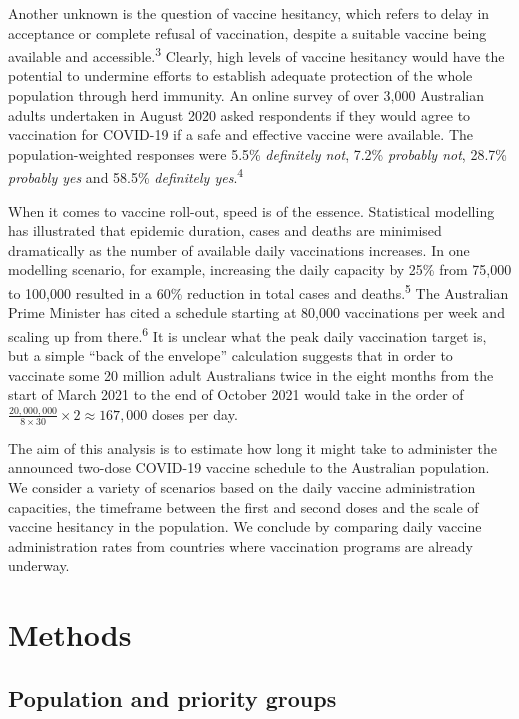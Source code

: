 \documentclass{article}
\begin{document}
Another unknown is the question of vaccine hesitancy, which refers to
delay in acceptance or complete refusal of vaccination, despite a
suitable vaccine being available and accessible.\textsuperscript{3}
Clearly, high levels of vaccine hesitancy would have the potential to
undermine efforts to establish adequate protection of the whole
population through herd immunity. An online survey of over 3,000
Australian adults undertaken in August 2020 asked respondents if they
would agree to vaccination for COVID-19 if a safe and effective vaccine
were available. The population-weighted responses were 5.5\%
\emph{definitely not}, 7.2\% \emph{probably not}, 28.7\% \emph{probably
yes} and 58.5\% \emph{definitely yes}.\textsuperscript{4}

When it comes to vaccine roll-out, speed is of the essence. Statistical
modelling has illustrated that epidemic duration, cases and deaths are
minimised dramatically as the number of available daily vaccinations
increases. In one modelling scenario, for example, increasing the daily
capacity by 25\% from 75,000 to 100,000 resulted in a 60\% reduction in
total cases and deaths.\textsuperscript{5} The Australian Prime Minister
has cited a schedule starting at 80,000 vaccinations per week and
scaling up from there.\textsuperscript{6} It is unclear what the peak
daily vaccination target is, but a simple ``back of the envelope''
calculation suggests that in order to vaccinate some 20 million adult
Australians twice in the eight months from the start of March 2021 to
the end of October 2021 would take in the order of
\(\frac{20,000,000}{8 \times 30} \times 2 \approx 167,000\) doses per
day.

The aim of this analysis is to estimate how long it might take to
administer the announced two-dose COVID-19 vaccine schedule to the
Australian population. We consider a variety of scenarios based on the
daily vaccine administration capacities, the timeframe between the first
and second doses and the scale of vaccine hesitancy in the population.
We conclude by comparing daily vaccine administration rates from
countries where vaccination programs are already underway.

\hypertarget{methods}{%
\section{Methods}\label{methods}}

\hypertarget{population-and-priority-groups}{%
\subsection{Population and priority
groups}\label{population-and-priority-groups}}
\end{document}
